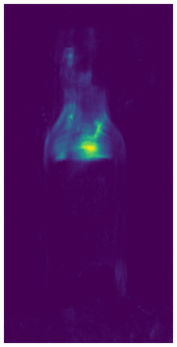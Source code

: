 \begin{figure}[H]
\begin{subfigure}[b]{\textwidth}
\begin{minipage}{0.45\textwidth}
            \includegraphics[width=\textwidth]{figures/appendix/appendix_DRAEM/JB/280_mask.png}
        \end{minipage}
    \end{subfigure}


\end{figure}
